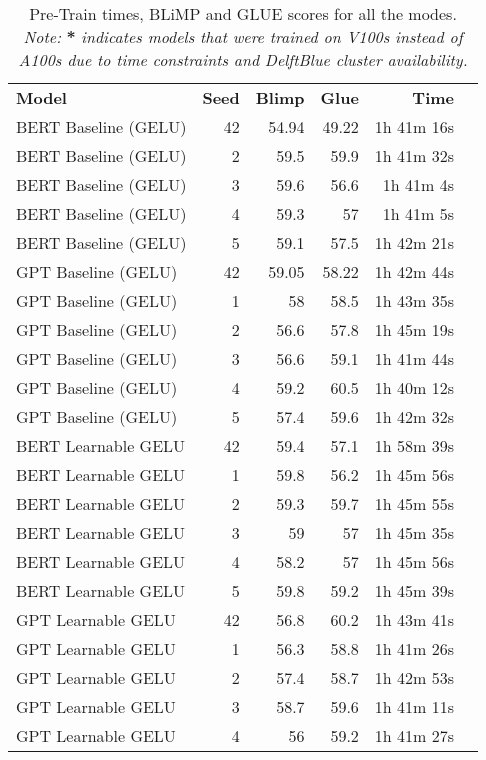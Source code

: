 \begin{table}[!htp]\centering
    \caption{Pre-Train times, BLiMP and GLUE scores for all the modes. \textit{Note:} \textbf{*} \textit{indicates models that were trained on V100s instead of A100s due to time constraints and DelftBlue cluster availability.}}
    \label{tab:all-results }
    \scriptsize
    \begin{tabular}{lrrrrr}\toprule
    \textbf{Model} &\textbf{Seed} &\textbf{Blimp} &\textbf{Glue} &\textbf{Time} \\\cmidrule{1-5}
    BERT Baseline (GELU) &42 &54.94 &49.22 &1h 41m 16s \\
    BERT Baseline (GELU) &2 &59.5 &59.9 &1h 41m 32s \\
    BERT Baseline (GELU) &3 &59.6 &56.6 &1h 41m 4s \\
    BERT Baseline (GELU) &4 &59.3 &57 &1h 41m 5s \\
    BERT Baseline (GELU) &5 &59.1 &57.5 &1h 42m 21s \\
    GPT Baseline (GELU) &42 &59.05 &58.22 &1h 42m 44s \\
    GPT Baseline (GELU) &1 &58 &58.5 &1h 43m 35s \\
    GPT Baseline (GELU) &2 &56.6 &57.8 &1h 45m 19s \\
    GPT Baseline (GELU) &3 &56.6 &59.1 &1h 41m 44s \\
    GPT Baseline (GELU) &4 &59.2 &60.5 &1h 40m 12s \\
    GPT Baseline (GELU) &5 &57.4 &59.6 &1h 42m 32s \\
    BERT Learnable GELU &42 &59.4 &57.1 &1h 58m 39s \\
    BERT Learnable GELU &1 &59.8 &56.2 &1h 45m 56s \\
    BERT Learnable GELU &2 &59.3 &59.7 &1h 45m 55s \\
    BERT Learnable GELU &3 &59 &57 &1h 45m 35s \\
    BERT Learnable GELU &4 &58.2 &57 &1h 45m 56s \\
    BERT Learnable GELU &5 &59.8 &59.2 &1h 45m 39s \\
    GPT Learnable GELU &42 &56.8 &60.2 &1h 43m 41s \\
    GPT Learnable GELU &1 &56.3 &58.8 &1h 41m 26s \\
    GPT Learnable GELU &2 &57.4 &58.7 &1h 42m 53s \\
    GPT Learnable GELU &3 &58.7 &59.6 &1h 41m 11s \\
    GPT Learnable GELU &4 &56 &59.2 &1h 41m 27s \\

\end{tabular}
\end{table}
